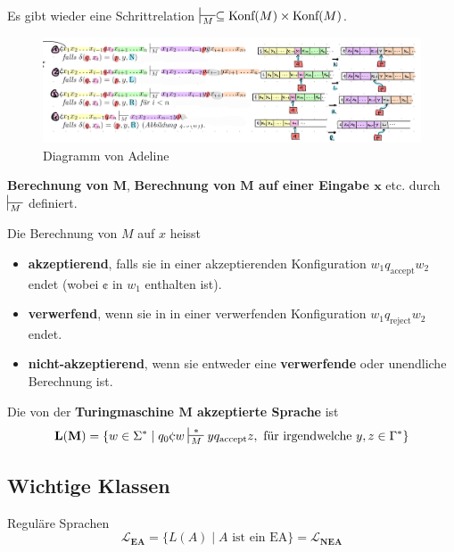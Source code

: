 \documentclass[a4paper, 11pt]{article}
\begin{document}
        Es gibt wieder eine Schrittrelation $\sststile{M}{} \subseteq \text{Konf}(M) \times \text{Konf}(M)$.
    
        \begin{figure}[htp]
            \includegraphics[width=\textwidth]{Images/Schrittrelation.png}
            \caption{Diagramm von Adeline}
        \end{figure}
    
        \textbf{Berechnung von $\mathbf{M}$}, \textbf{Berechnung von $\mathbf{M}$ auf einer Eingabe $\mathbf{x}$} etc. durch $\sststile{M}{}$ definiert.
    
        \begin{mainbox}{}
            Die Berechnung von $M$ auf $x$ heisst 
            \begin{itemize}[label=-]
                \item \textbf{akzeptierend}, falls sie in einer akzeptierenden Konfiguration $w_1q_{\text{accept}}w_2$ endet (wobei $\cent$ in $w_1$ enthalten ist).
                \item \textbf{verwerfend}, wenn sie in in einer verwerfenden Konfiguration $w_1q_{\text{reject}}w_2$ endet.
                \item \textbf{nicht-akzeptierend}, wenn sie entweder eine \textbf{verwerfende} oder unendliche Berechnung ist.
            \end{itemize}
        \end{mainbox}
    
        \begin{mainbox}{}
            Die von der \textbf{Turingmaschine $\mathbf{M}$ akzeptierte Sprache} ist 
            $$\mathbf{L(M)} = \{w \in \Sigma^* \mid q_0\cent w \sststile{M}{*}yq_{\text{accept}}z, \text{ für irgendwelche }y, z \in \Gamma^*\}$$
        \end{mainbox}
    
    
    
        \subsection{Wichtige Klassen}
        \begin{subbox}{Reguläre Sprachen}
            $$\mathbf{\mathcal{L}_{\textbf{EA}}} = \{L(A) \mid A \text{ ist ein EA}\} = {\mathcal{L}_{\textbf{NEA}}}$$
        \end{subbox}
    
\end{document}
